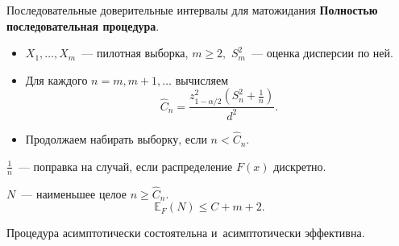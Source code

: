 \documentclass[9pt,pdf,utf8,hyperref={unicode},aspectratio=169]{beamer}
\renewcommand{\leq}{\leqslant}
\renewcommand{\geq}{\geqslant}
\begin{document}
\begin{frame}{Последовательные доверительные интервалы для матожидания}
	\textbf{Полностью последовательная процедура}.
    \begin{itemize}
    \item $X_{1},\dots,X_{m}$~--- пилотная выборка, $m\geq 2,$ \; $S_m^2$~--- оценка дисперсии по ней.
    \item Для каждого $n=m,m+1,\dots$ вычисляем $$\hat{C}_n = \frac{z^2_{1-\alpha/2}\left(S_n^2+\frac1{n}\right)}{d^2}.$$
    \item Продолжаем набирать выборку, если $n < \hat{C}_n$.
    \end{itemize}
	$\frac1{n}$~--- поправка на случай, если распределение $F\left(x\right)$ дискретно.
	
	\bigskip
	
	$N$~--- наименьшее целое $n\geq \hat{C}_n$.
	$$\mathbb{E}_{F}\left(N\right) \leq C + m + 2.$$
	
	Процедура асимптотически состоятельна и~асимптотически эффективна.
\end{frame}
\end{document}

